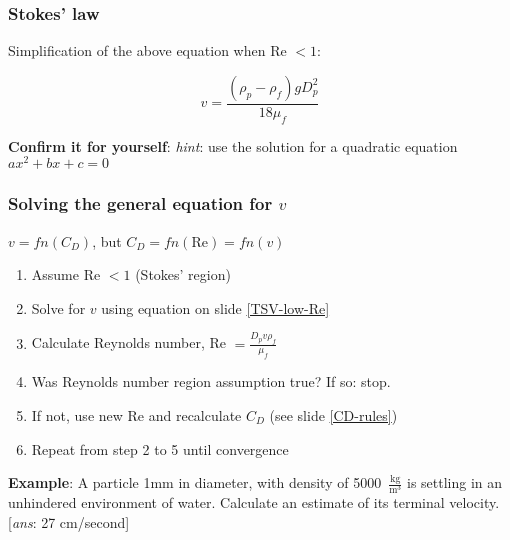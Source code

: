 \begin{frame}\frametitle{Stokes' law}

	Simplification of the above equation when Re $< 1$:

	\[
		v = \frac{\left( \rho_p - \rho_f \right) g D_p^2}{18 \mu_f} \label{TSV-low-Re}
	\]

	\vspace{12pt}
	\textbf{Confirm it for yourself}: \emph{hint}: use the solution for a quadratic equation $ax^2 + bx + c = 0$
	
\end{frame}

\begin{frame}\frametitle{Solving the general equation for $v$}

	$v = fn(C_D)$, but $C_D = fn(\text{Re}) = fn(v)$

	\begin{enumerate}
		\item	Assume Re $< 1$ (Stokes' region)
		\item	Solve for $v$ using equation on slide \ref{TSV-low-Re}
		\item	Calculate Reynolds number, Re $= \displaystyle \frac{D_p v \rho_f}{\mu_f}$
		\item	Was Reynolds number region assumption true? If so: stop.
		\item	If not, use new Re and recalculate $C_D$ (see slide \ref{CD-rules})
		\item	Repeat from step 2 to 5 until convergence
	\end{enumerate}

	\vspace{12pt}
	\textbf{Example}: A particle 1mm in diameter, with density of 5000~$\displaystyle \frac{\text{kg}}{\text{m}^3}$ is settling in an unhindered environment of water. Calculate an estimate of its terminal velocity. [\emph{ans}: 27 cm/second]
\end{frame}

